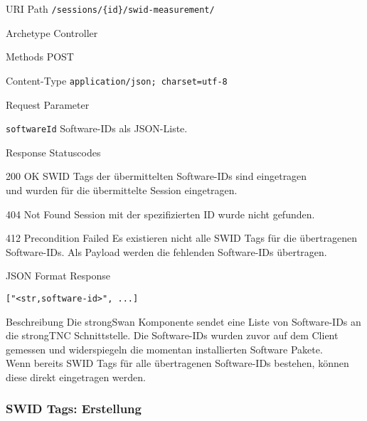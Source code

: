 \documentclass[10pt,a4paper]{scrartcl}
\begin{document}
\begin{mdframed}[style=def]
\begin{description*}
	\item[URI Path] \texttt{/sessions/\{id\}/swid-measurement/}
	\item[Archetype] Controller
	\item[Methods] POST
	\item[Content-Type] \texttt{application/json; charset=utf-8}
	\item[Request Parameter] \hfill
	\begin{description*}
		\item[\texttt{softwareId}] Software-IDs als JSON-Liste.
	\end{description*}
	\item[Response Statuscodes] \hfill
		\begin{description*}
			\item[200 OK] SWID Tags der übermittelten Software-IDs sind eingetragen \\
			und wurden für die übermittelte Session eingetragen.
			\item[404 Not Found] Session mit der spezifizierten ID wurde nicht gefunden. 
			\item[412 Precondition Failed] Es existieren nicht alle SWID Tags für die
			übertragenen Software-IDs. Als Payload werden die fehlenden Software-IDs
			übertragen.
		\end{description*}
	\item[JSON Format Response] \hfill
\begin{lstlisting}
["<str,software-id>", ...]
\end{lstlisting}
	\item[Beschreibung] Die strongSwan Komponente sendet eine Liste von
	Software-IDs an die strongTNC Schnittstelle. Die Software-IDs wurden zuvor auf
	dem Client gemessen und widerspiegeln die momentan installierten Software
	Pakete.\\
	Wenn bereits SWID Tags für alle übertragenen Software-IDs bestehen, können
	diese direkt eingetragen werden.
\end{description*}
\end{mdframed}


\subsubsection{SWID Tags: Erstellung}
\end{document}

